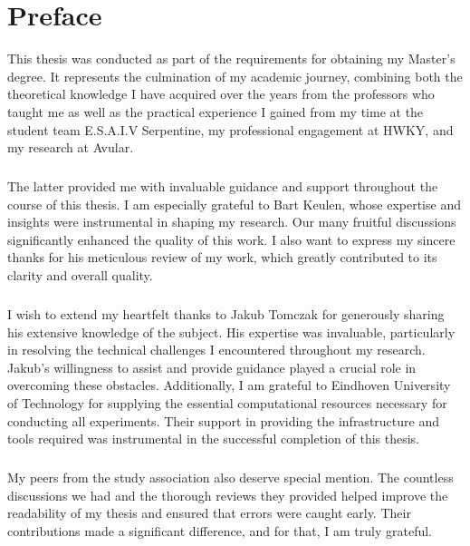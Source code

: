 \chapter*{Preface}\label{chapter:preface}

This thesis was conducted as part of the requirements for obtaining my Master’s degree. It represents the culmination of my academic journey, combining both the theoretical knowledge I have acquired over the years from the professors who taught me as well as the practical experience I gained from my time at the student team E.S.A.I.V Serpentine, my professional engagement at HWKY, and my research at Avular.

\paragraph*{}The latter provided me with invaluable guidance and support throughout the course of this thesis. I am especially grateful to Bart Keulen, whose expertise and insights were instrumental in shaping my research. Our many fruitful discussions significantly enhanced the quality of this work. I also want to express my sincere thanks for his meticulous review of my work, which greatly contributed to its clarity and overall quality.

\paragraph*{}I wish to extend my heartfelt thanks to Jakub Tomczak for generously sharing his extensive knowledge of the subject. His expertise was invaluable, particularly in resolving the technical challenges I encountered throughout my research. Jakub's willingness to assist and provide guidance played a crucial role in overcoming these obstacles. Additionally, I am grateful to Eindhoven University of Technology for supplying the essential computational resources necessary for conducting all experiments. Their support in providing the infrastructure and tools required was instrumental in the successful completion of this thesis.

\paragraph*{}My peers from the study association also deserve special mention. The countless discussions we had and the thorough reviews they provided helped improve the readability of my thesis and ensured that errors were caught early. Their contributions made a significant difference, and for that, I am truly grateful.

